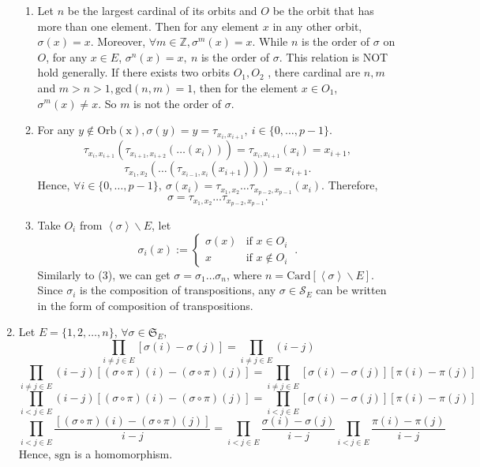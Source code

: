 \documentclass[12pt]{article}
\newcommand{\ZZ}{\mathbb{Z}}
\begin{document}
\begin{enumerate}
\begin{enumerate}
            \item Let $n$ be the largest cardinal of its orbits and $O$ be the orbit that has more than one element. Then for any element $x$ in any other orbit,  $\sigma(x)=x$. Moreover, $\forall m\in \ZZ, \sigma^m(x)=x$. While $n$ is the order of $\sigma$ on $O$, for any $x\in E$, $\sigma^n(x)=x,\  n$ is the order of $\sigma$. This relation is NOT hold generally. If there exists two orbits $O_1,O_2$ , there cardinal are $n,m$ and $m>n>1,\mathrm{gcd}(n,m)=1 $, then for the element $x\in O_1$,  $\sigma^m(x)\not= x$. So $m$ is not the order of $\sigma$.
            \item For any $y\notin \mathrm{Orb(x)},\sigma(y)=y=\tau_{x_i,x_{i+1}},\ i\in \{0,\dots,p-1\}$.
                $$\tau_{x_i,x_{i+1}}(\tau_{x_{i+1},x_{i+2}}(\dots(x_i)))=\tau_{x_i,x_{i+1}}(x_i)=x_{i+1},$$
                $$\tau_{x_1,x_2}(\dots(\tau_{x_{i-1},x_i}(x_{i+1})))=x_{i+1}.$$
                Hence, $\forall i\in \{0,\dots,p-1\},\ \sigma(x_i)=\tau_{x_1,x_2}\dots \tau_{x_{p-2},x_{p-1}}(x_i).$ Therefore, 
                $$\sigma=\tau_{x_1,x_2}\dots\tau_{x_{p-2},x_{p-1}}.$$
            \item Take $O_i$ from $ \left \langle \sigma \right \rangle \backslash E$, let 
                $$\sigma_i(x):= \left\{ \begin{matrix}
                    \sigma(x) & \text{if } x\in O_i\\
                    x & \text{if } x\notin O_i
                \end{matrix} \ . \right. $$
                Similarly to (3), we can get $\sigma=\sigma_1\dots\sigma_n$, where $n=\mathrm{Card}[\left \langle \sigma \right \rangle \backslash E]$. Since $\sigma_i$ is the composition of transpositions, any $\sigma\in \mathcal{S}_E$ can be written in the form of composition of transpositions.
        \end{enumerate}
    \item Let $E=\{1,2,\dots,n\}$, $\forall \sigma\in \mathfrak{S}_E,$
            $$\prod_{i\not=j\in E}[\sigma(i)-\sigma(j)]=\prod_{i\not=j\in E}(i-j)$$
            $$\prod_{i\not=j\in E}(i-j)[(\sigma\circ \pi) (i)-(\sigma\circ\pi)(j)]=\prod_{i\not=j\in E}[\sigma(i)-\sigma(j)][\pi(i)-\pi(j)]$$
            $$\prod_{i<j\in E}(i-j)[(\sigma\circ \pi) (i)-(\sigma\circ\pi)(j)]=\prod_{i<j\in E}[\sigma(i)-\sigma(j)][\pi(i)-\pi(j)]$$
            $$\prod_{i<j\in E}\frac{[(\sigma\circ \pi) (i)-(\sigma\circ\pi)(j)]}{i-j}=\prod_{i<j\in E}\frac{\sigma(i)-\sigma(j)}{i-j}\prod_{i<j\in E}\frac{\pi(i)-\pi(j)}{i-j}$$
            Hence, $\mathrm{sgn}$ is a homomorphism.

\end{enumerate}
\end{document}

